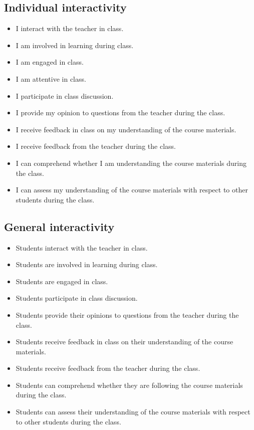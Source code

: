 \subsection{Individual interactivity}
\begin{itemize}
    \item I interact with the teacher in class.
    \item I am involved in learning during class.
    \item I am engaged in class.
    \item I am attentive in class.
    \item I participate in class discussion.
    \item I provide my opinion to questions from the teacher during the class.
    \item I receive feedback in class on my understanding of the course materials.
    \item I receive feedback from the teacher during the class.
    \item I can comprehend whether I am understanding the course materials during the class.
    \item I can assess my understanding of the course materials with respect to other students during the class.
\end{itemize}

\subsection{General interactivity}
\begin{itemize}
    \item Students interact with the teacher in class.
    \item Students are involved in learning during class.
    \item Students are engaged in class.
    \item Students participate in class discussion.
    \item Students provide their opinions to questions from the teacher during the class.
    \item Students receive feedback in class on their understanding of the course materials.
    \item Students receive feedback from the teacher during the class.
    \item Students can comprehend whether they are following the course materials during the class.
    \item Students can assess their understanding of the course materials with respect to other students during the class.
\end{itemize}